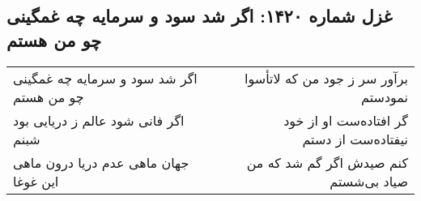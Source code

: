 \begin{center}
\section*{غزل شماره ۱۴۲۰: اگر شد سود و سرمایه چه غمگینی چو من هستم}
\label{sec:1420}
\begin{longtable}{l p{0.5cm} r}
اگر شد سود و سرمایه چه غمگینی چو من هستم
&&
برآور سر ز جود من که لاتأسوا نمودستم
\\
اگر فانی شود عالم ز دریایی بود شبنم
&&
گر افتاده‌ست او از خود نیفتاده‌ست از دستم
\\
جهان ماهی عدم دریا درون ماهی این غوغا
&&
کنم صیدش اگر گم شد که من صیاد بی‌شستم
\\
\end{longtable}
\end{center}
